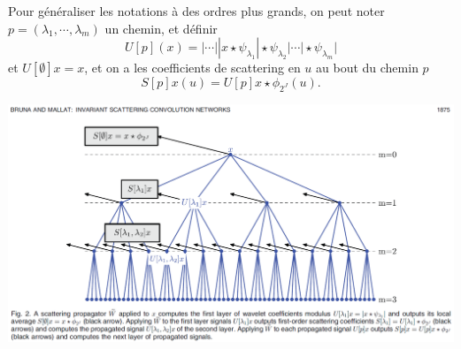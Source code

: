 \documentclass[11pt]{article} %
\begin{document}
Pour généraliser les notations à des ordres plus grands, on peut noter $p=(\lambda_1, \cdots, \lambda_m)$ un chemin, et définir
\begin{equation}
	U[p](x) = |\cdots||x\star\psi_{\lambda_1}|\star\psi_{\lambda_2}|\cdots|\star\psi_{\lambda_m}|
\end{equation}
et $U[\emptyset]x = x$,
et on a les coefficients de scattering en $u$ au bout du chemin $p$
\begin{equation}
	S[p]x(u) = U[p]x\star\phi_{2^J}(u).
\end{equation}
\newline

\includegraphics[width=\textwidth]{scat_net}
\end{document}
